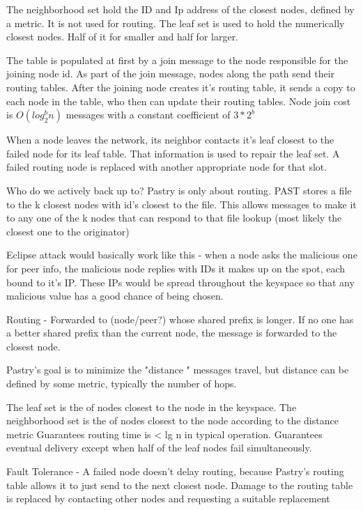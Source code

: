 \documentclass[10pt,letterpaper]{report}
\begin{document}
The neighborhood set hold the ID and Ip address of the closest nodes, defined by a metric.  It is not used for routing.  The leaf set is used to hold the numerically closest nodes. Half of it for smaller and half for larger.

The table is populated at first by a join message to the node responsible for the joining node id.  As part of the join message, nodes  along the path send their routing tables.  After the joining node creates it's routing table, it sends a copy to each node in the table, who then can update their routing tables.   Node join cost is $O(log_2^b n)$ messages  with  a constant  coefficient  of $3*2^b$

When a node leaves the network, its neighbor contacts it's leaf closest to the failed node  for its leaf table.  That information is used to repair the leaf set.  A failed routing node is replaced with another appropriate node for that slot.  


Who do we actively back up to? Pastry is only about routing. PAST stores a file  to the k closest nodes with id's closest to the file.  This allows messages to make it to any one of the k nodes that can respond to that file lookup (most likely the closest one to the originator)

Eclipse attack would basically work like this -  when a node asks the malicious one for peer info, the malicious node replies with IDs it makes up on the spot, each bound to it's IP. These IPs would be spread throughout the keyspace so that any malicious value has a good chance of being chosen.

Routing - Forwarded to (node/peer?) whose shared prefix is longer.  If no one  has a better shared prefix than the current node, the message is forwarded to the closest  node.

Pastry's goal is to minimize the "distance " messages travel, but distance can be defined by some metric, typically the number of hops.


The leaf set is the  of nodes closest to the node in the keyspace.  The neighborhood set is the  of nodes closest to the node according to the distance metric
Guarantees  routing time is  < lg n in typical operation.  Guarantees eventual delivery except when half of the leaf nodes fail simultaneously.


Fault Tolerance -  A failed node doesn't delay  routing, because Pastry's routing table allows it to just send to the next closest node.  Damage to the routing table is replaced by contacting other nodes and requesting a suitable replacement
\end{document}
